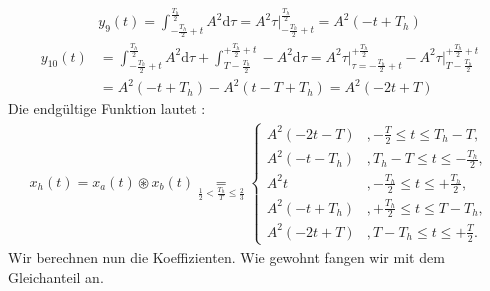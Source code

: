\documentclass[11pt,a4paper,DIV=12]{scrartcl}
\newcommand{\diff}{\mathrm{d}}
\begin{document}
\begin{align}
	y_9(t)=\int_{-\frac{T_h}{2}+t}^{\frac{T_h}{2}}A^2\diff \tau=A^2\tau\Bigg |_{-\frac{T_h}{2}+t}^{\frac{T_h}{2}}=A^2(-t+T_h)
\end{align}
\begin{align}
	y_{10}(t)&=\int_{-\frac{T_h}{2}+t}^{\frac{T_h}{2}}A^2\diff \tau+\int_{T-\frac{T_h}{2}}^{+\frac{T_h}{2}+t}-A^2\diff \tau=A^2\tau\Bigg |_{\tau=-\frac{T_h}{2}+t}^{+\frac{T_h}{2}}-A^2\tau\Bigg |_{T-\frac{T_h}{2}}^{+\frac{T_h}{2}+t}\nonumber \\
	&=A^2(-t+T_h)-A^2(t-T+T_h)=A^2(-2t+T)
\end{align}
Die endgültige Funktion lautet :
\begin{align}
	x_{h}(t)=x_{a}(t)\circledast x_{b}(t)\underset{\frac{1}{2}<\frac{T_h}{T}\leq \frac{2}{3}}{=}\begin{cases}
		A^2(-2t-T) &,-\frac{T}{2}\leq t\leq  T_h-T, \\
		A^2(-t-T_h)&,T_h-T\leq t \leq -\frac{T_h}{2},\\
		A^2t &,-\frac{T_h}{2}\leq t \leq +\frac{T_h}{2},\\
		A^2(-t+T_h) &,+\frac{T_h}{2}\leq t \leq T-T_h, \\
		A^2(-2t+T) &,T-T_h \leq t \leq +\frac{T}{2}.
		\end{cases}
\end{align}
Wir berechnen nun die Koeffizienten. Wie gewohnt fangen wir mit dem Gleichanteil an.
\end{document}
